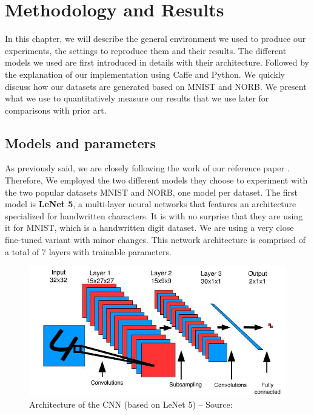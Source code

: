 \documentclass[a4paper,12pt]{report}
\begin{document}
\chapter{Methodology and Results}

In this chapter, we will describe the general environment we used to produce our experiments, the settings to reproduce them and their results.
The different models we used are first introduced in details with their architecture.
Followed by the explanation of our implementation using Caffe and Python.
We quickly discuss how our datasets are generated based on MNIST and NORB.
We present what we use to quantitatively measure our results that we use later for comparisons with prior art.

\section{Models and parameters}

As previously said, we are closely following the work of our reference paper \cite{hadsell2006dimensionality}.
Therefore, We employed the two different models they choose to experiment with the two popular datasets MNIST and NORB, one model per dataset.
The first model is {\bf LeNet 5}, a multi-layer neural networks that features an architecture specialized for handwritten characters.
It is with no surprise that they are using it for MNIST, which is a handwritten digit dataset.
We are using a very close fine-tuned variant with minor changes.
This network architecture is comprised of a total of 7 layers with trainable parameters.

\begin{figure}[h]
    \begin{center}
        \includegraphics{thesis_figures/siamese_cnn.jpg}
    \end{center}
    \caption{Architecture of the CNN (based on LeNet 5) -- Source: \cite{hadsell2006dimensionality}}
    \label{fig:siamese_cnn}
\end{figure}
\end{document}
